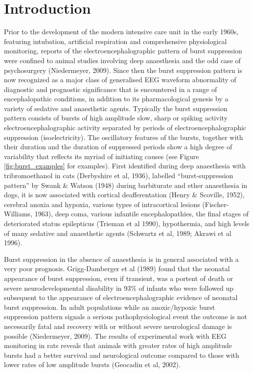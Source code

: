 \documentclass[a4paper,12pt]{article}
\begin{document}
\section{Introduction}
Prior to the development of the modern intensive care unit in the early
1960s, featuring intubation, artificial respiration and comprehensive
physiological monitoring, reports of the electroencephalographic
pattern of burst suppression were confined to animal studies involving
deep anaesthesia and the odd case of psychosurgery (Niedermeyer,
2009). Since then the burst suppression pattern is now recognized as
a major class of generalised EEG waveform abnormality of diagnostic
and prognostic significance that is encountered in a range of
encephalopathic conditions, in addition to its pharmacological genesis
by a variety of sedative and anaesthetic agents. Typically the burst
suppression pattern consists of bursts of high amplitude slow, sharp or
spiking activity electroencephalographic activity separated by periods
of electroencephalographic suppression (isoelectricity). The oscillatory
features of the bursts, together with their duration and the duration of
suppressed periods show a high degree of variability that reflects its
myriad of initiating causes (see Figure \ref{fig:burst_examples} for examples). First identified
during deep anaesthesia with tribromoethanol in cats (Derbyshire et al,
1936), labelled “burst-suppression pattern” by Swank \& Watson (1948) during barbiturate and ether anaesthesia in dogs,
it is now
associated with cortical deafferentation (Henry \& Scoville, 1952),
cerebral anoxia and hypoxia, various types of intracortical lesions
(Fischer-Williams, 1963), deep coma, various infantile
encephalopathies, the final stages of deteriorated status epilepticus
(Trieman et al 1990), hypothermia, and high levels of many sedative
and anaesthetic agents (Schwartz et al, 1989; Akrawi et al 1996).

Burst suppression in the absence of anaesthesia is in general
associated with a very poor prognosis. Grigg-Damberger et al (1989)
found that the neonatal appearance of burst suppression, even if
transient, was a portent of death or severe neurodevelopmental
disability in 93\% of infants who were followed up subsequent to the
appearance of electroencephalographic evidence of neonatal burst
suppression. In adult populations while an anoxic/hypoxic burst
suppression pattern signals a serious pathophysiological event the
outcome is not necessarily fatal and recovery with or without severe
neurological damage is possible (Niedermeyer, 2009). The results of
experimental work with EEG monitoring in rats reveals that animals with
greater rates of high amplitude bursts had a better survival and
neurological outcome compared to those with lower rates of low
amplitude bursts (Geocadin et al, 2002).
\end{document}
